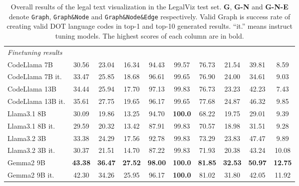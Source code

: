 \begin{table*}[t]
\begin{tabular}{lccccccccc}
\midrule
\multicolumn{7}{l}{\textit{Finetuning results}} \\
CodeLlama 7B &  30.56 & 23.04 & 16.34 & 94.43 & 99.57& 76.73 & 21.54 & 39.81 & 8.59\\
CodeLlama 7B it. \hspace{-1em} & 33.47 & 25.85 & 18.68& 96.61 & 99.65 & 76.90 & 24.00 & 34.61 & 9.03\\
CodeLlama 13B & 34.44 & 25.94 & 17.70 & 97.13 & 99.83& 76.73 & 23.23 & 42.23 & 7.43\\ 
CodeLlama 13B it. \hspace{-1em} & 35.61 & 27.75 & 19.65 & 96.17 & 99.65 & 77.68 & 24.87 & 46.32 & 9.85\\
Llama3.1 8B &  30.09 & 19.86 & 13.25 & 94.70 & \textbf{100.0} & 68.22 & 19.75 & 29.01 & 9.39\\
Llama3.1 8B it. \hspace{-1em} &  29.59 & 20.32 & 13.42 & 87.91 & 99.83& 70.57 & 18.98 & 31.51 & 9.28\\
Llama3.2 3B &  33.38 & 24.29 & 17.56 & 92.78 & 99.83 & 73.29 & 23.83 & 47.47 & 9.89\\
Llama3.2 3B it. \hspace{-1em} &  30.37 & 21.51 & 14.70 & 87.22 & 99.83& 71.93 & 20.38 & 43.24 & 10.08\\
Gemma2 9B  &  \textbf{43.38} & \textbf{36.47} & \textbf{27.52} & \textbf{98.00} & \textbf{100.0}& \textbf{81.85} & \textbf{32.53} & \textbf{50.97} & \textbf{12.75} \\
Gemma2 9B it. &  42.30 & 34.26 & 25.95 & 96.17 & \textbf{100.0}& 81.02 & 31.80 & 42.05 & 11.92\\
\bottomrule
\end{tabular}
\caption{
Overall results of the legal text visualization in the LegalViz test set.
\textbf{G}, \textbf{G-N} and \textbf{G-N-E} denote \texttt{Graph}, \texttt{Graph\&Node} and  \texttt{Graph\&Node\&Edge} respectively. Valid Graph is success rate of creating valid DOT language codes in top-1 and top-10 generated results. ``it.'' means instruct tuning models. 
The highest scores of each column are in bold.
}
\label{table:generation_performance}
\end{table*}

